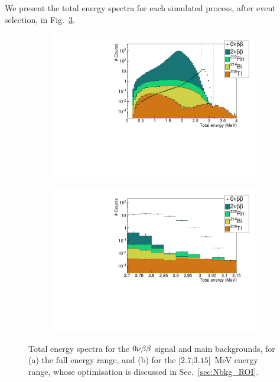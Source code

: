We present the total energy spectra for each simulated process, after event selection, in Fig.~\ref{fig:energy_spectra}.
\begin{figure}[h]
\centering
\begin{subfigure}[t]{0.7\textwidth}
  \centering
  \includegraphics[width=1.1\textwidth]{Sensitivity/fig_sensitivity/energy_spectrum_with_B_82Se.pdf}
  \captionsetup{justification=centering}
  \caption{
    \label{subfig:energy_spectra_full}}
\end{subfigure}
\hfill
\begin{subfigure}[t]{0.7\textwidth}
  \centering
  \includegraphics[width=1.1\textwidth]{Sensitivity/fig_sensitivity/energy_spectrum_with_B_82Se_zoom.pdf}
  \captionsetup{justification=centering}
  \caption{
    \label{subfig:energy_spectra_zoom}}
\end{subfigure}
\caption{Total energy spectra for the $0\nu\beta\beta$ signal and main backgrounds, for (a) the full energy range, and (b) for the [$2.7$;$3.15$]~MeV energy range, whose optimisation is discussed in Sec.~\ref{sec:Nbkg_ROI}.
  \label{fig:energy_spectra}}
\end{figure}
